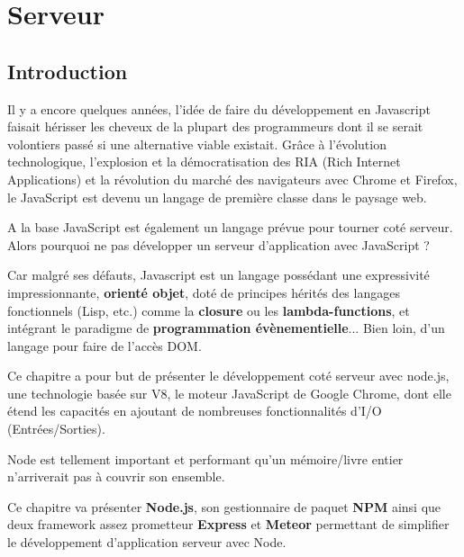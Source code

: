 \chapter{Serveur}

\section{Introduction}
\label{ch:introServeur}



Il y a encore quelques années, l’idée de faire du développement en Javascript faisait hérisser les cheveux de la plupart des programmeurs dont il se serait volontiers passé si une alternative viable existait. Grâce à l'évolution technologique, l'explosion et la démocratisation des RIA (Rich Internet Applications) et la révolution du marché des navigateurs avec Chrome et Firefox, le JavaScript est devenu un langage de première classe dans le paysage web.

A la base JavaScript est également un langage prévue pour tourner coté serveur. Alors pourquoi ne pas développer un serveur d’application avec JavaScript ?

Car malgré ses défauts, Javascript est un langage possédant une expressivité impressionnante, \textbf{orienté objet}, doté de principes hérités des langages fonctionnels (Lisp, etc.) comme la \textbf{closure} ou les \textbf{lambda-functions}, et intégrant le paradigme de \textbf{programmation évènementielle}... Bien loin, d’un langage pour faire de l’accès DOM. 

Ce chapitre a pour but de présenter le développement coté serveur avec  node.js, une technologie basée sur V8, le moteur JavaScript de Google Chrome, dont elle étend les capacités en ajoutant de nombreuses fonctionnalités d'I/O (Entrées/Sorties).

Node est tellement important et performant qu’un mémoire/livre entier n’arriverait pas à couvrir son ensemble.

Ce chapitre va présenter \textbf{Node.js}, son gestionnaire de paquet \textbf{NPM} ainsi que deux framework assez prometteur \textbf{Express} et \textbf{Meteor} permettant de simplifier le développement d’application serveur avec Node.
